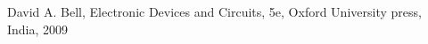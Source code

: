 \begin{thebibliography}[99]
\bibitem[] David A. Bell, Electronic Devices and Circuits, 5e, Oxford University press, India, 2009

\bibitem[]

\bibitem[]

\bibitem[]

\bibitem[]

\bibitem[]

\bibitem[]

\bibitem[]

\bibitem[]

\bibitem[]

\bibitem[]

\bibitem[]

\end{thebibliography}
